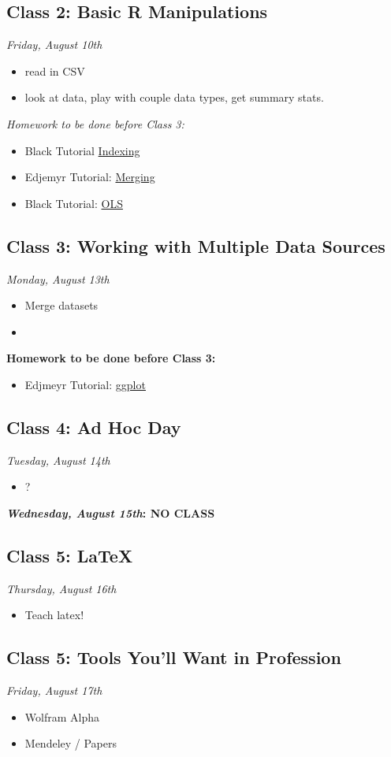 \documentclass[12pt]{article}
\begin{document}
\subsection*{Class 2: Basic R Manipulations}
\emph{Friday, August 10th}
\begin{itemize}
    \item read in CSV
    \item look at data, play with couple data types, get summary stats.
\end{itemize}

\emph{Homework to be done before Class 3:}
\begin{itemize}
    \item Black Tutorial \href{https://www.cyclismo.org/tutorial/R/vectorIndexing.html}{Indexing}
    \item Edjemyr Tutorial: \href{https://sejdemyr.github.io/r-tutorials/basics/merging-appending/}{Merging}
    \item Black Tutorial: \href{https://www.cyclismo.org/tutorial/R/linearLeastSquares.html}{OLS}
\end{itemize}

\subsection*{Class 3: Working with Multiple Data Sources}
\emph{Monday, August 13th}
\begin{itemize}
    \item Merge datasets
    \item
\end{itemize}

\textbf{Homework to be done before Class 3:}
\begin{itemize}
    \item Edjmeyr Tutorial: \href{https://sejdemyr.github.io/r-tutorials/statistics/tutorial2.html#graphing-with-ggplot}{ggplot}
\end{itemize}


\subsection*{Class 4: Ad Hoc Day}
\emph{Tuesday, August 14th}
\begin{itemize}
    \item ?
\end{itemize}

\textbf{\emph{Wednesday, August 15th}: NO CLASS}

\subsection*{Class 5: LaTeX}
\emph{Thursday, August 16th}
\begin{itemize}
    \item Teach latex!
\end{itemize}

\subsection*{Class 5: Tools You'll Want in Profession}
\emph{Friday, August 17th}
\begin{itemize}
    \item Wolfram Alpha
    \item Mendeley / Papers
\end{itemize}
\end{document}
